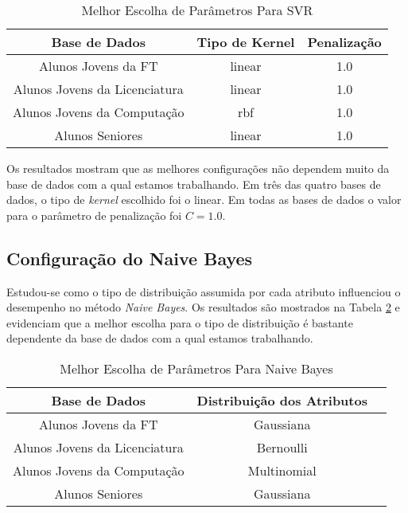 \begin{table}
\caption{Melhor Escolha de Parâmetros Para SVR}
\begin{center}
\begin{tabular}[c]{| c | c | c |}
    \hline
    \textbf{Base de Dados} & \textbf{Tipo de Kernel} & \textbf{Penalização} \\
    \hline
    Alunos Jovens da FT & linear & 1.0 \\
    \hline
    Alunos Jovens da Licenciatura & linear & 1.0 \\
    \hline
    Alunos Jovens da Computação & rbf & 1.0 \\
    \hline
    Alunos Seniores & linear & 1.0 \\
    \hline
\end{tabular}
\end{center}
\label{svr_conf}
\end{table}

Os resultados mostram que as melhores configurações não dependem muito da base de
dados com a qual estamos trabalhando. Em três das quatro bases de dados, o tipo de
\textit{kernel} escolhido foi o linear. Em todas as bases de dados o valor para o
parâmetro de penalização foi $C = 1.0$.   

\subsection{Configuração do Naive Bayes} \label{nb_best_conf}
Estudou-se como o tipo de distribuição assumida por cada atributo influenciou o
desempenho no método \textit{Naive Bayes}. Os resultados são mostrados na Tabela \ref{conf_nb} e
evidenciam que a melhor escolha para o tipo de distribuição é bastante dependente da
base de dados com a qual estamos trabalhando. 

\begin{table}
\caption{Melhor Escolha de Parâmetros Para Naive Bayes}
\begin{center}
\begin{tabular}[c]{| c | c | c |}
    \hline
    \textbf{Base de Dados} & \textbf{Distribuição dos Atributos} \\
    \hline
    Alunos Jovens da FT & Gaussiana \\
    \hline
    Alunos Jovens da Licenciatura & Bernoulli \\
    \hline
    Alunos Jovens da Computação & Multinomial \\
    \hline
    Alunos Seniores & Gaussiana \\
    \hline
\end{tabular}
\end{center}
\label{conf_nb}
\end{table}

